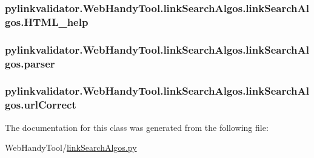\subsubsection[{H\+T\+M\+L\+\_\+help}]{\setlength{\rightskip}{0pt plus 5cm}pylinkvalidator.\+Web\+Handy\+Tool.\+link\+Search\+Algos.\+link\+Search\+Algos.\+H\+T\+M\+L\+\_\+help}\hypertarget{classpylinkvalidator_1_1_web_handy_tool_1_1link_search_algos_1_1link_search_algos_a8941e82772705f2e0462a628532075d1}{}\label{classpylinkvalidator_1_1_web_handy_tool_1_1link_search_algos_1_1link_search_algos_a8941e82772705f2e0462a628532075d1}
\subsubsection[{parser}]{\setlength{\rightskip}{0pt plus 5cm}pylinkvalidator.\+Web\+Handy\+Tool.\+link\+Search\+Algos.\+link\+Search\+Algos.\+parser}\hypertarget{classpylinkvalidator_1_1_web_handy_tool_1_1link_search_algos_1_1link_search_algos_a326fd2c6dda6c9ecd87e7e09c2fdd2cc}{}\label{classpylinkvalidator_1_1_web_handy_tool_1_1link_search_algos_1_1link_search_algos_a326fd2c6dda6c9ecd87e7e09c2fdd2cc}
\subsubsection[{url\+Correct}]{\setlength{\rightskip}{0pt plus 5cm}pylinkvalidator.\+Web\+Handy\+Tool.\+link\+Search\+Algos.\+link\+Search\+Algos.\+url\+Correct}\hypertarget{classpylinkvalidator_1_1_web_handy_tool_1_1link_search_algos_1_1link_search_algos_adaaf5c989830ecfbdf552255678a0eb2}{}\label{classpylinkvalidator_1_1_web_handy_tool_1_1link_search_algos_1_1link_search_algos_adaaf5c989830ecfbdf552255678a0eb2}


The documentation for this class was generated from the following file\+:\begin{DoxyCompactItemize}
\item 
Web\+Handy\+Tool/\hyperlink{link_search_algos_8py}{link\+Search\+Algos.\+py}\end{DoxyCompactItemize}
